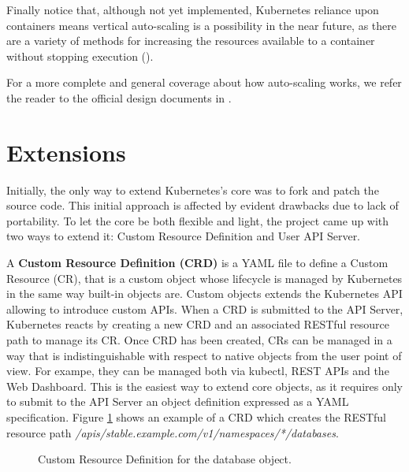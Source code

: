 Finally notice that, although not yet implemented, Kubernetes reliance upon containers means vertical auto-scaling is a possibility in the near future, as there are a variety of methods for increasing the resources available to a container without stopping execution (\cite{matthias2015docker}).

For a more complete and general coverage about how auto-scaling works, we refer the reader to the official design documents in \cite{kubernetes-hpa-design-web}.


\section{Extensions}
\label{sec:kubernetes-extensions}

Initially, the only way to extend Kubernetes's core was to fork and patch the source code.
%
This initial approach is affected by evident drawbacks due to lack of portability.
%
To let the core be both flexible and light, the project came up with two ways to extend it: Custom Resource Definition and User API Server.

A \textbf{Custom Resource Definition (CRD)} is a YAML file to define a Custom Resource (CR), that is a custom object whose lifecycle is managed by Kubernetes in the same way built-in objects are.
%
Custom objects extends the Kubernetes API allowing to introduce custom APIs.
%
When a CRD is submitted to the API Server, Kubernetes reacts by creating a new CRD and an associated RESTful resource path to manage its CR.
%
Once CRD has been created, CRs can be managed in a way that is indistinguishable with respect to native objects from the user point of view. For exampe, they can be managed both via kubectl, REST APIs and the Web Dashboard.
%
This is the easiest way to extend core objects, as it requires only to submit to the API Server an object definition expressed as a YAML specification.
%
Figure \ref{fig:kubernetes-crd} shows an example of a CRD which creates the RESTful resource path \textit{/apis/stable.example.com/v1/namespaces/*/databases}.

\begin{figure}
\label{fig:kubernetes-crd}

\caption{Custom Resource Definition for the database object.}
\end{figure}
%

